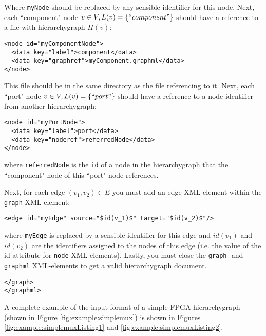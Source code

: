 Where \texttt{myNode} should be replaced by any sensible identifier for this node. Next, each ``component" node $v \in V, L(v)=\{``component"\}$ should have a reference to a file with hierarchygraph $H(v)$: 

\begin{lstlisting}[mathescape, frame=single]
<node id="myComponentNode">
  <data key="label">component</data>
  <data key="graphref">myComponent.graphml</data>
</node>
\end{lstlisting}

This file should be in the same directory as the file referencing to it. Next, each ``port" node $v \in V, L(v)=\{``port"\}$ should have a reference to a node identifier from another hierarchygraph:

\begin{lstlisting}[mathescape, frame=single]
<node id="myPortNode">
  <data key="label">port</data>
  <data key="noderef">referredNode</data>
</node>
\end{lstlisting}

where \texttt{referredNode} is the \texttt{id} of a node in the hierarchygraph that the ``component" node of this ``port" node references.

Next, for each edge $(v_1, v_2) \in E$ you must add an edge XML-element within the \texttt{graph} XML-element:

\begin{lstlisting}[frame=single, mathescape]
<edge id="myEdge" source="$id(v_1)$" target="$id(v_2)$"/>
\end{lstlisting}

where \texttt{myEdge} is replaced by a sensible identifier for this edge and $id(v_1)$ and $id(v_2)$ are the identifiers assigned to the nodes of this edge (i.e. the value of the id-attribute for \texttt{node} XML-elements). Lastly, you must close the \texttt{graph}- and \texttt{graphml} XML-elements to get a valid hierarchygraph document.

\begin{lstlisting}[frame=single]
</graph>
</graphml>
\end{lstlisting}

A complete example of the input format of a simple FPGA hierarchygraph (shown in Figure \ref{fig:example:simplemux}) is shown in Figures \ref{fig:example:simplemuxListing1} and \ref{fig:example:simplemuxListing2}.

